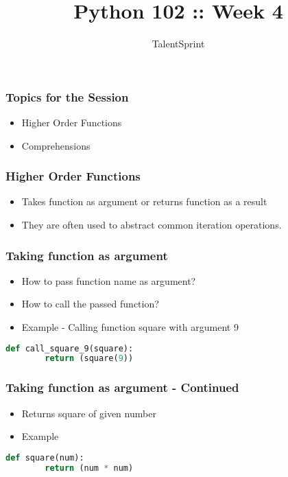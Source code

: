 \documentclass[14pt]{beamer}
\title{Python 102 :: Week 4}
\date{}
\author[TS]{TalentSprint}
\begin{document}
    \begin{frame}
        \titlepage
    \end{frame}
    \begin{frame}
        \frametitle{Topics for the Session}
        \begin{itemize}
            \item Higher Order Functions
            \item Comprehensions
        \end{itemize}
    \end{frame}
    \begin{frame}
        \frametitle{Higher Order Functions}
        \begin{itemize}
            \item Takes function as argument or returns function as a result
            \item They are often used to abstract common iteration operations.
        \end{itemize}
    \end{frame}

    \begin{frame}[containsverbatim]
        \frametitle{Taking function as argument}
        \begin{itemize}
            \item How to pass function name as argument?
            \item How to call the passed function? 
            \item \alert {Example - Calling function square with argument 9}
        \end{itemize}
        \begin{lstlisting}[language=Python]
def call_square_9(square):
        return (square(9))
        \end{lstlisting}
	\end{frame}
	
    \begin{frame}[containsverbatim]
        \frametitle{Taking function as argument - Continued}
        \begin{itemize}
		\item Returns square of given number		
        \item \alert {Example}
        \end{itemize}
        \begin{lstlisting}[language=Python]
def square(num):
        return (num * num)
        \end{lstlisting}
    \end{frame}
\end{document}

